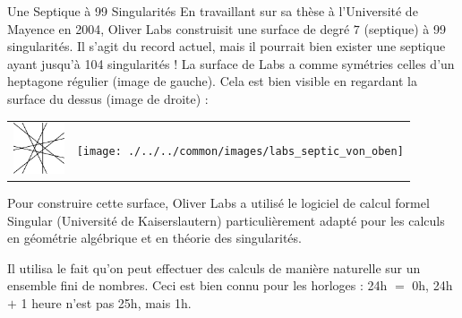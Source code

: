 \begin{surferPage}{Une Septique à 99 Singularités}
    En travaillant sur sa thèse à l'Université de Mayence en 2004, Oliver Labs 
    construisit une surface de degré $7$ (septique) à 99 singularités. Il s'agit du record actuel,
    mais il pourrait bien exister une septique ayant jusqu'à 104 singularités !
    La surface de Labs a comme symétries celles d'un heptagone régulier (image de gauche).
    Cela est bien visible en regardant la surface du dessus (image de droite) :

    \vspace*{-0.3em}
    \begin{center}
      \begin{tabular}{c@{\qquad}c}
        \includegraphics[height=1.5cm]{./../../common/images/labsseptic1.pdf}
        &
        \texttt{[image: ./../../common/images/labs\_septic\_von\_oben]}
      \end{tabular}
    \end{center}
    \vspace*{-0.3em}

    Pour construire cette surface, Oliver Labs a utilisé le logiciel de calcul formel
    {\sc Singular} (Université de Kaiserslautern) particulièrement adapté pour les calculs
    en géométrie algébrique et en théorie des singularités.

    Il utilisa le fait qu'on peut effectuer des calculs de manière naturelle sur un ensemble 
    fini de nombres. Ceci est bien connu pour les horloges :
    24h $=$ 0h, 24h $+$ 1 heure n'est pas 25h, mais 1h.
\end{surferPage}
